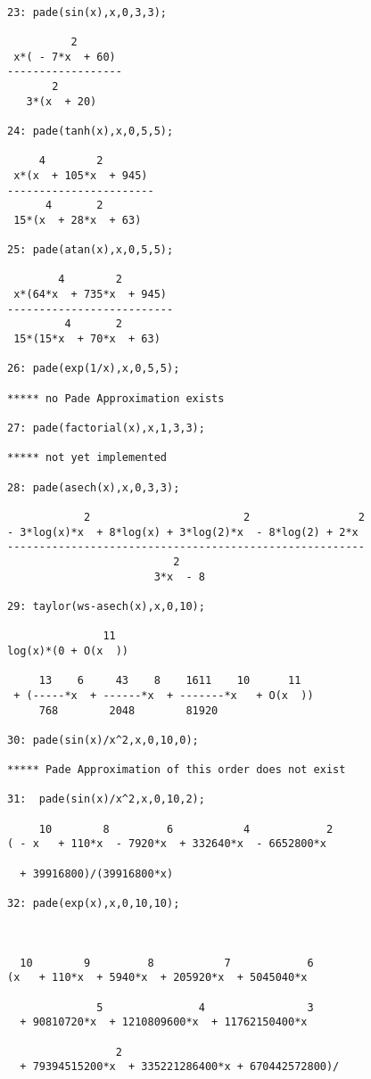 \documentclass[11pt,a4paper]{article}
\begin{document}
\begin{verbatim}

23: pade(sin(x),x,0,3,3);

          2
 x*( - 7*x  + 60)
------------------
       2
   3*(x  + 20)

24: pade(tanh(x),x,0,5,5);

     4        2
 x*(x  + 105*x  + 945)
-----------------------
      4       2
 15*(x  + 28*x  + 63)

25: pade(atan(x),x,0,5,5);

        4        2
 x*(64*x  + 735*x  + 945)
--------------------------
         4       2
 15*(15*x  + 70*x  + 63)

26: pade(exp(1/x),x,0,5,5);

***** no Pade Approximation exists

27: pade(factorial(x),x,1,3,3);

***** not yet implemented

28: pade(asech(x),x,0,3,3);

            2                        2                 2
- 3*log(x)*x  + 8*log(x) + 3*log(2)*x  - 8*log(2) + 2*x
--------------------------------------------------------
                          2
                       3*x  - 8

29: taylor(ws-asech(x),x,0,10);

               11  
log(x)*(0 + O(x  ))

     13    6     43    8    1611    10      11
 + (-----*x  + ------*x  + -------*x   + O(x  ))
     768        2048        81920

30: pade(sin(x)/x^2,x,0,10,0);

***** Pade Approximation of this order does not exist

31:  pade(sin(x)/x^2,x,0,10,2);

     10        8         6           4            2
( - x   + 110*x  - 7920*x  + 332640*x  - 6652800*x

  + 39916800)/(39916800*x)

32: pade(exp(x),x,0,10,10);



  10        9         8           7            6
(x   + 110*x  + 5940*x  + 205920*x  + 5045040*x

              5               4                3
  + 90810720*x  + 1210809600*x  + 11762150400*x

                 2
  + 79394515200*x  + 335221286400*x + 670442572800)/


\end{verbatim}
\end{document}
